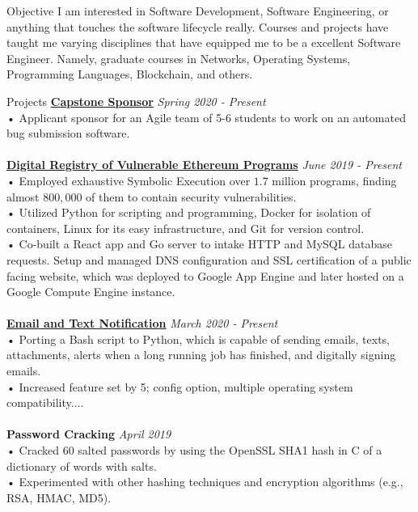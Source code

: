 \documentclass{resume} %
\begin{document}
\begin{rSection}{Objective}
  I am interested in Software Development, Software Engineering, or anything that touches the software lifecycle really. Courses and projects have taught me varying disciplines that have equipped me to be a excellent Software Engineer. Namely, graduate courses in Networks, Operating Systems, Programming Languages, Blockchain, and others. 
\end{rSection}
\begin{rSection}{Projects}
  {\bf \href{https://docs.google.com/presentation/d/11ACdzalpubDKvJFnA6a\_5ST7Dd3P\_EbLrq1DEpJKloM/edit#slide=id.p}{Capstone Sponsor}} \hfill {\em{Spring 2020 - Present}}
  \\• Applicant sponsor for an Agile team of 5-6 students to work on an automated bug submission software.\\
    \\{\bf \href{https://www.haveibeenexploited.com/}{Digital Registry of Vulnerable Ethereum Programs}} \hfill {\em{June 2019 - Present}}
  \\• Employed exhaustive Symbolic Execution over $1.7$ million programs, finding almost $800,000$ of them to contain security vulnerabilities.
  \\• Utilized Python for scripting and programming, Docker for isolation of containers, Linux for its easy infrastructure, and Git for version control.
  \\• Co-built a React app and Go server to intake HTTP and MySQL database requests. Setup and managed DNS configuration and SSL certification of a public facing website, which was deployed to Google App Engine and later hosted on a Google Compute Engine instance.\\
  \\{\bf \href{https://github.com/tdulcet/Send-Msg-CLI/tree/python-port}{Email and Text Notification}} \hfill {\em{March 2020 - Present}}
  \\• Porting a Bash script to Python, which is capable of sending emails, texts, attachments, alerts when a long running job has finished, and digitally signing emails.
  \\• Increased feature set by 5; config option, multiple operating system compatibility....\\
  \\{\bf Password Cracking} \hfill {\em{April 2019}}
  \\• Cracked 60 salted passwords by using the OpenSSL SHA1 hash in C of a dictionary of words with salts.
  \\• Experimented with other hashing techniques and encryption algorithms (e.g., RSA, HMAC, MD5).

\end{rSection}
\end{document}
